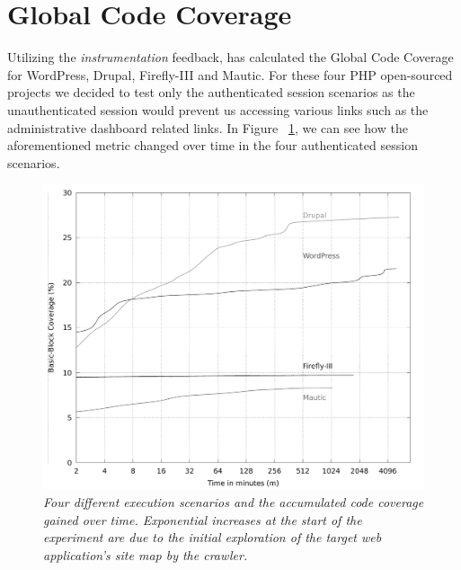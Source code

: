 \section{Global Code Coverage}
Utilizing the \emph{instrumentation} feedback, \pname{} has calculated the Global Code Coverage for WordPress, Drupal, Firefly-III and Mautic. For these four PHP open-sourced projects we decided to test only the authenticated session scenarios as the unauthenticated session would prevent us accessing various links such as the administrative dashboard related links. In Figure ~\ref{fig:plot_coverage}, we can see how the aforementioned metric changed over time in the four authenticated session scenarios.

\begin{figure}[!htb]
  \centering \includegraphics[width=\linewidth]{figures/plot_coverage.pdf}
  \captionsetup{justification=centering}
  \caption[Accumulated global code coverage using \pname{}]{\textit{Four different execution scenarios and the accumulated code coverage gained over time. Exponential increases at the start of the experiment are due to the initial exploration of the target web application's site map by the crawler.}} 
  \label{fig:plot_coverage}
\end{figure}

